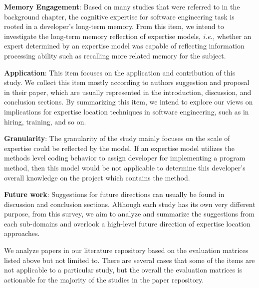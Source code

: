 \textbf{Memory Engagement}: Based on many studies that were referred to in the background chapter, the cognitive expertise for software engineering task is rooted in a developer's long-term memory. From this item, we intend to investigate the long-term memory reflection of expertise models, \textit{i.e.,} whether an expert determined by an expertise model was capable of reflecting information processing ability such as recalling more related memory for the subject.

\textbf{Application}: This item focuses on the application and contribution of this study. We collect this item mostly according to authors suggestion and proposal in their paper, which are usually represented in the introduction, discussion, and conclusion sections. By summarizing this item, we intend to explore our views on implications for expertise location techniques in software engineering, such as in hiring, training, and so on.

\textbf{Granularity}: The granularity of the study mainly focuses on the scale of expertise could be reflected by the model. If an expertise model utilizes the methods level coding behavior to assign developer for implementing a program method, then this model would be not applicable to determine this developer's overall knowledge on the project which contains the method. 

\textbf{Future work}: Suggestions for future directions can usually be found in discussion and conclusion sections. Although each study has its own very different purpose, from this survey, we aim to analyze and summarize the suggestions from each sub-domains and overlook a high-level future direction of expertise location approaches. 

We analyze papers in our literature repository based on the evaluation matrices listed above but not limited to. There are several cases that some of the items are not applicable to a particular study, but the overall the evaluation matrices is actionable for the majority of the studies in the paper repository.
